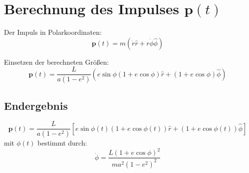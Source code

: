 \section{Berechnung des Impulses \( \mathbf{p}(t) \)}
Der Impuls in Polarkoordinaten:
\[
\mathbf{p}(t) = m \left( \dot{r} \hat{r} + r \dot{\phi} \hat{\phi} \right)
\]

Einsetzen der berechneten Größen:
\[
\mathbf{p}(t) = \frac{L}{a(1 - e^2)} \left( e \sin \phi (1 + e \cos \phi) \hat{r} + (1 + e \cos \phi) \hat{\phi} \right)
\]

\subsection{Endergebnis}
\[
\boxed{ \mathbf{p}(t) = \frac{L}{a(1 - e^2)} \left[ e \sin \phi(t) (1 + e \cos \phi(t)) \hat{r} + (1 + e \cos \phi(t)) \hat{\phi} \right] }
\]
mit \( \phi(t) \) bestimmt durch:
\[
\dot{\phi} = \frac{L (1 + e \cos \phi)^2}{m a^2 (1 - e^2)^2}
\]